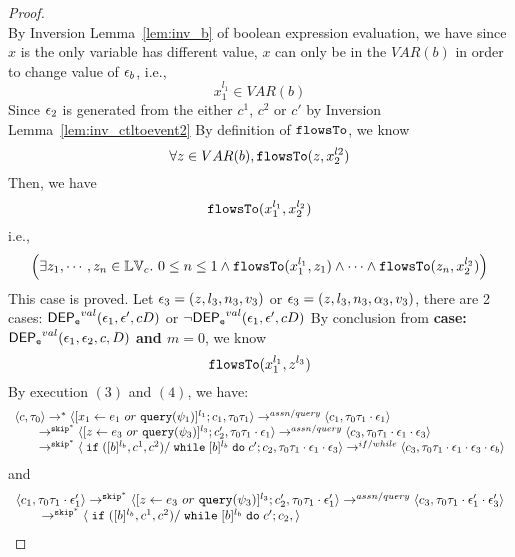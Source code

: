 {\begin{proof}
\[\]
%
By {Inversion Lemma~\ref{lem:inv_b}} of boolean expression evaluation, we have since $x$ is the only variable has different value, $x$ can only be in the $VAR(b)$ in order to change value of $\mathtt{\epsilon}_b$, i.e.,
 \[
  x_1^{l_1} \in VAR(b)
 \]
 Since $\mathtt{\epsilon}_2$ is generated from the either $c^1$, $c^2$ or $c'$ by {Inversion Lemma~\ref{lem:inv_ctltoevent2}}
 By definition of $\mathtt{flowsTo}$, we know
 \[
 \forall z \in VAR(b), \mathtt{flowsTo}(z, x_2^{l2})
 \]
 Then, we have
 \[
 \mathtt{flowsTo}(x_1^{l_1}, x_2^{l_2})
 \]
 i.e.,
 \[
 \Big( \exists z_1, \cdots, z_n \in \mathbb{LV}_{{c}}. ~ 0 \leq n \leq 1 \land
  \mathtt{flowsTo}(x_1^{l_1}, z_1) 
  \land \cdots \land \mathtt{flowsTo}(z_n, x_2^{l_2}) \Big)
 \]
  This case is proved.
%
\subcaseL{$\event_3 \in \eventset^{\asn}$}
Let $\mathtt{\epsilon}_3 = (z, l_3, n_3, v_3)$ or $\mathtt{\epsilon}_3 = (z, l_3, n_3, \alpha_3, v_3)$, there are 2 cases:
$\mathsf{DEP_{\mathtt{e}}}^{val}(\mathtt{\epsilon}_1, \mathtt{\epsilon}', c D)$ or $\neg \mathsf{DEP_{\mathtt{e}}}^{val}(\mathtt{\epsilon}_1, \mathtt{\epsilon}', c D)$
%
%
By conclusion from \textbf{case: $\mathsf{DEP_{\mathtt{e}}}^{val}(\mathtt{\epsilon}_1, \mathtt{\epsilon}_2, c, D)$ and $m = 0$}, we know
\[
  \mathtt{flowsTo}(x_1^{l_1}, z^{l_3})
\]
%
By execution $(3)$ and $(4)$, we have:
\[
  \begin{array}{l}   
  \langle {c}, \mathtt{\tau}_0 \rangle 
  \rightarrow^{*} 
  \langle [\mathrel{ {x}_1 \leftarrow e_1~ or ~ {\tt query}(\psi_1) }]^{l_1} ; {c}_1, \mathtt{\tau}_0 \mathtt{\tau}_1 \rangle  \rightarrow^{assn/query}
 \langle c_1, \mathtt{\tau}_0 \mathtt{\tau}_1 \cdot \mathtt{\epsilon}_1 \rangle 
  \\ 
  \qquad \rightarrow^{\mathtt{skip}^*} 
  \langle [\mathrel{ z \leftarrow e_3~ or ~ {\tt query}(\psi_3) }]^{l_3}; {c}_2', 
  \mathtt{\tau}_0 \mathtt{\tau}_1 \cdot \mathtt{\epsilon}_1 \rangle 
  \rightarrow^{assn / query} 
  \langle {c}_3,  \mathtt{\tau}_0 \mathtt{\tau}_1 \cdot \mathtt{\epsilon}_1 \cdot \mathtt{\epsilon}_3 \rangle 
  \\ 
  \qquad \rightarrow^{\mathtt{skip}^*} 
  \langle \;\mathtt{if}\;([b]{}^{l_b}, c^1, c^2) / \;\mathtt{while}\; [b]{}^{l_b} \;\mathtt{do}\; c'; {c}_2, 
  \mathtt{\tau}_0 \mathtt{\tau}_1 \cdot \mathtt{\epsilon}_1 \cdot \mathtt{\epsilon}_3 \rangle 
  \rightarrow^{if / while} 
  \langle {c}_3,  \mathtt{\tau}_0 \mathtt{\tau}_1 \cdot \mathtt{\epsilon}_1 \cdot \mathtt{\epsilon}_3 \cdot \mathtt{\epsilon}_b \rangle 
\end{array}
 \]
and 
 \[
  \begin{array}{l}   
  \langle c_1, \mathtt{\tau}_0 \mathtt{\tau}_1 \cdot \mathtt{\epsilon}_1' \rangle 
  \rightarrow^{\mathtt{skip}^*} 
  \langle [\mathrel{ z \leftarrow e_3~ or ~ {\tt query}(\psi_3) }]^{l_3}; {c}_2', 
  \mathtt{\tau}_0 \mathtt{\tau}_1 \cdot \mathtt{\epsilon}_1' \rangle 
  \rightarrow^{assn / query} 
  \langle {c}_3,  \mathtt{\tau}_0 \mathtt{\tau}_1 \cdot \mathtt{\epsilon}_1' \cdot \mathtt{\epsilon}_3' \rangle 
  \\ 
  \qquad \rightarrow^{\mathtt{skip}^*} 
  \langle \;\mathtt{if}\;([b]{}^{l_b}, c^1, c^2) / \;\mathtt{while}\; [b]{}^{l_b} \;\mathtt{do}\; c'; {c}_2, 
 \rangle
\end{array}\]
\end{proof}}
